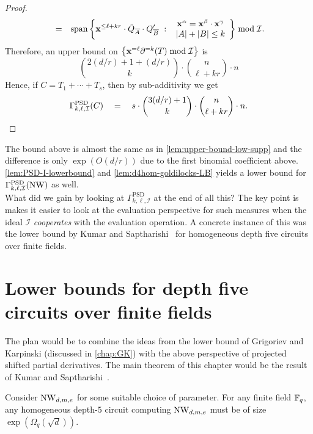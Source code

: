 \begin{proof}
\begin{eqnarray*}
& = & \mathrm{span}\left\{{ \mathbf{x}^{\leq \ell + kr} \cdot \tilde{Q}_{\overline{A}} \cdot Q_{\overline{B}}'}\ : \ {\begin{array}{c} \mathbf{x}^{\alpha} = \mathbf{x}^\beta \cdot \mathbf{x}^\gamma\\ |A| + |B| \leq k  \end{array}}\right\} \bmod \mathcal{I}.
\end{eqnarray*}
\noindent
Therefore, an upper bound on $\left\{\mathbf{x}^{=\ell} \partial^{=k}(T) \bmod \mathcal{I}\right\}$ is 
\[
\binom{2(d/r) + 1 + (d/r)}{k} \cdot \binom{n}{\ell + kr} \cdot n
\]
\noindent
Hence, if $C = T_1 + \cdots + T_s$, then by sub-additivity we get
\[
\Gamma^{\mathrm{PSD}}_{k,\ell,\mathcal{I}}(C) \quad = \quad s \cdot \binom{3(d/r) + 1}{k} \cdot \binom{n}{\ell + kr} \cdot n.\qedhere
\]
\end{proof}

\noindent
The bound above is almost the same as in \autoref{lem:upper-bound-low-supp} and the difference is only $\exp(O(d/r))$ due to the first binomial coefficient above. \autoref{lem:PSD-I-lowerbound} and 
\autoref{lem:d4hom-goldilocks-LB} yields a lower bound for $\Gamma^{\mathrm{PSD}}_{k,\ell,\mathcal{I}}(\operatorname{\mathrm{NW}})$ as well. \\

What did we gain by looking at $\Gamma^{\mathrm{PSD}}_{k,\ell,\mathcal{I}}$ at the end of all this?
The key point is makes it easier to look at the evaluation perspective for such measures when the ideal $\mathcal{I}$ \emph{cooperates} with the evaluation operation.
A concrete instance of this was the lower bound by Kumar and Saptharishi~\cite{KumarSapt15} for homogeneous depth five circuits over finite fields.

\section{Lower bounds for depth five circuits over finite fields}

The plan would be to combine the ideas from the lower bound of Grigoriev and Karpinski \cite{grigoriev98} (discussed in \autoref{chap:GK}) with the above perspective of projected shifted partial derivatives.
The main theorem of this chapter would be the result of Kumar and Saptharishi~\cite{KumarSapt15}.

\begin{theorem}\label{thm:Kumar-Sapt-d5-thm}
Consider $\operatorname{\mathrm{NW}}_{d,m,e}$ for some suitable choice of parameter. For any finite field $\mathbb{F}_q$, any homogeneous depth-$5$ circuit computing $\operatorname{\mathrm{NW}}_{d,m,e}$ must be of size $\exp(\Omega_q(\sqrt{d}))$. 
\end{theorem}

